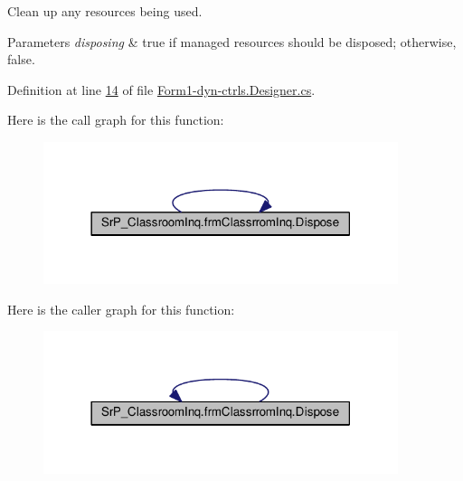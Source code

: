 \-Clean up any resources being used. 


\begin{DoxyParams}{\-Parameters}
{\em disposing} & true if managed resources should be disposed; otherwise, false.\\
\hline
\end{DoxyParams}


\-Definition at line \hyperlink{_form1-dyn-ctrls_8_designer_8cs_source_l00014}{14} of file \hyperlink{_form1-dyn-ctrls_8_designer_8cs_source}{\-Form1-\/dyn-\/ctrls.\-Designer.\-cs}.



\-Here is the call graph for this function\-:
\nopagebreak
\begin{figure}[H]
\begin{center}
\leavevmode
\includegraphics[width=294pt]{class_sr_p___classroom_inq_1_1frm_classrrom_inq_a7e6095e2ed04a53088833156d8d205b1_cgraph}
\end{center}
\end{figure}




\-Here is the caller graph for this function\-:
\nopagebreak
\begin{figure}[H]
\begin{center}
\leavevmode
\includegraphics[width=294pt]{class_sr_p___classroom_inq_1_1frm_classrrom_inq_a7e6095e2ed04a53088833156d8d205b1_icgraph}
\end{center}
\end{figure}


